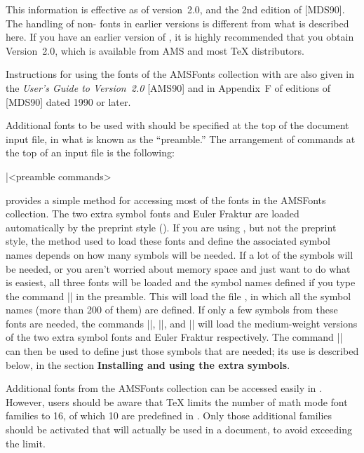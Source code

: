 \Warn  This information is effective as of \AmSTeX{} version~2.0,
  \amstexreleasedate{} and the 2nd edition of \JoT\/ [MDS90].
  The handling of non- fonts in earlier versions is
  different from what is described here.  If you have an earlier
  version of \AmSTeX, it is highly recommended that you obtain \AmSTeX{}
  Version~2.0, which is available from AMS and most \TeX{} distributors.
\endx

Instructions for using the fonts of the AMSFonts collection with \AmSTeX{}
are also given in the {\sl User's Guide to \AmSTeX{} Version~2.0\/} [AMS90]
and in Appendix~F of editions of \JoT{} [MDS90] dated 1990 or later.

Additional fonts to be used with \AmSTeX{} should be specified at the top
of the document input file, in what is known as the ``preamble.''  The
arrangement of commands at the top of an input file is the following:
\begintt

|<preamble commands>
\endtt

\AmSTeX{} provides a simple method for accessing most of the fonts in the
AMSFonts collection.  The two extra symbol fonts and Euler Fraktur are
loaded automatically by the preprint style ()\null.
If you are using \AmSTeX{}, but not the preprint style, the method used to
load these fonts and define the associated symbol names depends on how many
symbols will be needed.  If a lot of the symbols will be needed, or
you aren't worried about memory space and just want to do what is easiest,
all three fonts will be loaded and the symbol names defined if you type the
command |\UseAMSsymbols| in the preamble.  This will load the file
, in which all the symbol names (more than 200 of them)
are defined.  If only a few symbols from these fonts are needed, the
commands |\loadmsam|, |\loadmsbm|, and |\loadeufm| will load the
medium-weight versions of the two extra symbol fonts and Euler Fraktur
respectively.  The command |\newsymbol| can then be used to define just
those symbols that are needed; its use is described below, in the section
{\bf Installing and using the extra symbols}.

\Warn  Additional fonts from the AMSFonts collection can be accessed
  easily in \AmSTeX.
  However, users should be aware that \TeX{} limits the number of
  math mode font families to 16, of which 10 are predefined in \AmSTeX.
  Only those additional families should be activated that will actually
  be used in a document, to avoid exceeding the limit.
\endx

